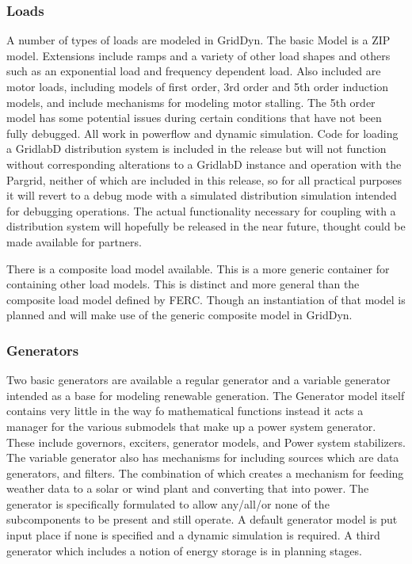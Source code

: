 \documentclass[12pt]{article} %
\begin{document}
\subsubsection{Loads}
A number of types of loads are modeled in GridDyn.  The basic Model is a ZIP model.  Extensions include ramps and a variety of other load shapes and others such as an exponential load and frequency dependent load.  Also included are motor loads, including models of first order, 3rd order and 5th order induction models, and include mechanisms for modeling motor stalling.  The 5th order model has some potential issues during certain conditions that have not been fully debugged.  All work in powerflow and dynamic simulation. Code for loading a GridlabD distribution system is included in the release but will not function without corresponding alterations to a GridlabD instance and operation with the Pargrid, neither of which are included in this release, so for all practical purposes it will revert to a debug mode with a simulated distribution simulation intended for debugging operations.  The actual functionality necessary for coupling with a distribution system will hopefully be released in the near future,  thought could be made available for partners.

There is a composite load model available.  This is a more generic container for containing other load models.  This is distinct and more general than the composite load model defined by FERC.  Though an instantiation of that model is planned and will make use of the generic composite model in GridDyn.

\subsubsection{Generators}
Two basic generators are available a regular generator and a variable generator intended as a base for modeling renewable generation.  The Generator model itself contains very little in the way fo mathematical functions instead it acts a manager for the various submodels that make up a power system generator.  These include governors, exciters, generator models, and Power system stabilizers.  The variable generator also has mechanisms for including sources which are data generators, and filters.  The combination of which creates a mechanism for feeding weather data to a solar or wind plant and converting that into power.  The generator is specifically formulated to allow any/all/or none of the subcomponents to be present and still operate.  A default generator model is put input place if none is specified and a dynamic simulation is required.  A third generator which includes a notion of energy storage is in planning stages.
\end{document}

